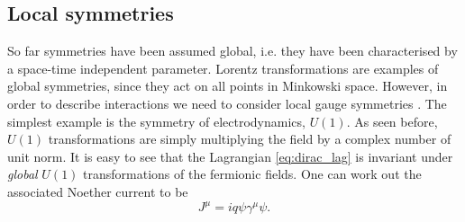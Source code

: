 \subsection{Local symmetries}
So far symmetries have been assumed global, i.e. they have been characterised by a space-time independent parameter. Lorentz transformations are examples of global symmetries, since they act on all points in Minkowski space. However, in order to describe interactions we need to consider local gauge symmetries \cite{goldberg_standard_2017}. The simplest example is the symmetry of electrodynamics, $U(1)$. As seen before, $U(1)$ transformations are simply multiplying the field by a complex number of unit norm. It is easy to see that the Lagrangian \eqref{eq:dirac_lag} is invariant under \textit{global} $U(1)$ transformations of the fermionic fields. One can work out the associated Noether current to be
\begin{equation}\label{eq:EM-Noether-curr}
    J^\mu = iq\psi \gamma^\mu \psi.
\end{equation}

